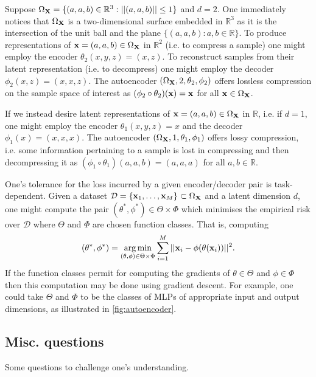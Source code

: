 \documentclass[11pt]{article}
\begin{document}
\begin{example}
    Suppose $\Omega_{\mathbf{X}}=\{(a,a,b)\in\mathbb{R}^3:||(a,a,b)||\leq1\}$ and $d=2$. One immediately notices that $\Omega_{\mathbf{X}}$ is a two-dimensional surface embedded in $\mathbb{R}^3$ as it is the intersection of the unit ball and the plane $\{(a,a,b):a,b\in\mathbb{R}\}$. To produce representations of $\mathbf{x}=(a,a,b)\in\Omega_{\mathbf{X}}$ in $\mathbb{R}^2$ (i.e. to compress a sample) one might employ the encoder $\theta_2(x,y,z)=(x,z)$. To reconstruct samples from their latent representation (i.e. to decompress) one might employ the decoder $\phi_2(x,z)=(x,x,z)$. The autoencoder $(\Omega_{\mathbf{X}},2,\theta_2,\phi_2)$ offers lossless compression on the sample space of interest as $(\phi_2\circ\theta_2)(\mathbf{x})=\mathbf{x}$ for all $\mathbf{x}\in\Omega_{\mathbf{X}}$.

    If we instead desire latent representations of $\mathbf{x}=(a,a,b)\in\Omega_{\mathbf{X}}$ in $\mathbb{R}$, i.e. if $d=1$, one might employ the encoder $\theta_1(x,y,z)=x$ and the decoder $\phi_1(x)=(x,x,x)$. The autoencoder $(\Omega_{\mathbf{X}},1,\theta_1,\phi_1)$ offers lossy compression, i.e. some information pertaining to a sample is lost in compressing and then decompressing it as $(\phi_1\circ\theta_1)(a,a,b)=(a,a,a)$ for all $a,b\in\mathbb{R}$.
\end{example}

One's tolerance for the loss incurred by a given encoder/decoder pair is task-dependent. Given a dataset $\mathcal{D}=\{\mathbf{x}_1,\dots,\mathbf{x}_M\}\subset\Omega_{\mathbf{X}}$ and a latent dimension $d$, one might compute the pair $(\theta^*,\phi^*)\in\Theta\times\Phi$ which minimises the empirical risk over $\mathcal{D}$ where $\Theta$ and $\Phi$ are chosen function classes. That is, computing
$$
(\theta^*,\phi^*)
=
\operatorname*{arg\,min}_{(\theta,\phi)\in\Theta\times\Phi}
\sum_{i=1}^M||\mathbf{x}_i-\phi(\theta(\mathbf{x}_i))||^2.
$$
If the function classes permit for computing the gradients of $\theta\in\Theta$ and $\phi\in\Phi$ then this computation may be done using gradient descent. For example, one could take $\Theta$ and $\Phi$ to be the classes of MLPs of appropriate input and output dimensions, as illustrated in \autoref{fig:autoencoder}.

\subsection{Misc. questions}

Some questions to challenge one's understanding.
\end{document}
